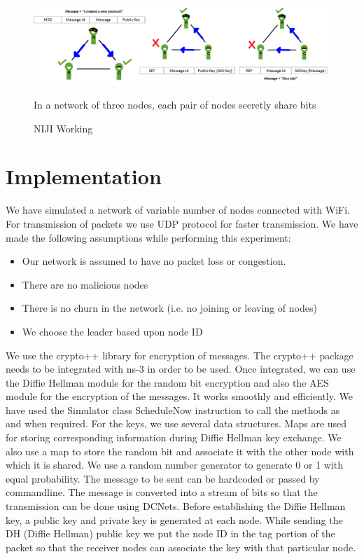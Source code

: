 \documentclass{acm_proc_article-sp}
\begin{document}
\begin{figure}
\centering
\includegraphics[scale=.40]{NIJI2.png} \caption{NIJI Working}
\medskip
\small
In a network of three nodes, each pair of nodes secretly share bits
\label{fig:NIJI}
\end{figure}



\section{Implementation}
\vspace{1 mm}

We have simulated a network of variable number of nodes connected with WiFi. For transmission of packets we use UDP protocol for faster transmission. We have made the following assumptions while performing this experiment:
\begin{itemize}

\item Our network is assumed to have no packet loss or congestion. 
\item There are no malicious nodes
\item There is no churn in the network (i.e. no joining or leaving of nodes)
\item We choose the leader based upon node ID
\end{itemize}
We use the crypto++ library for encryption of messages. The crypto++ package needs to be integrated with ns-3 in order to be used. Once integrated, we can use the Diffie Hellman module for the random bit encryption and also the AES module for the encryption of the messages. It works smoothly and efficiently.  We have used the Simulator class ScheduleNow instruction to call the methods as and when required. For the keys, we use several data structures. Maps are used for storing corresponding information during Diffie Hellman key exchange. We also use a map to store the random bit and associate it with the other node with which it is shared. We use a random number generator to generate 0 or 1 with equal probability. The message to be sent can be hardcoded or passed by commandline. The message is converted into a stream of bits so that the transmission can be done using DCNets.  Before establishing the Diffie Hellman key, a public key and private key is generated at each node. While sending the DH (Diffie Hellman) public key we put the node ID in the tag portion of the packet so that the receiver nodes can associate the key with that particular node. 
\end{document}
